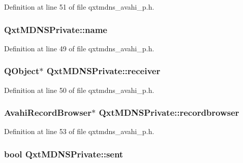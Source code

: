 Definition at line 51 of file qxtmdns\-\_\-avahi\-\_\-p.\-h.

\hypertarget{class_qxt_m_d_n_s_private_acf3fda20dc948af2f060c90a042dc545}{
\subsubsection[{name}]{ Qxt\-M\-D\-N\-S\-Private\-::name}}\label{class_qxt_m_d_n_s_private_acf3fda20dc948af2f060c90a042dc545}


Definition at line 49 of file qxtmdns\-\_\-avahi\-\_\-p.\-h.

\hypertarget{class_qxt_m_d_n_s_private_acfd639c9dc24a9f61a9ced21f723e5c9}{
\subsubsection[{receiver}]{\setlength{\rightskip}{0pt plus 5cm}Q\-Object$\ast$ Qxt\-M\-D\-N\-S\-Private\-::receiver}}\label{class_qxt_m_d_n_s_private_acfd639c9dc24a9f61a9ced21f723e5c9}


Definition at line 50 of file qxtmdns\-\_\-avahi\-\_\-p.\-h.

\hypertarget{class_qxt_m_d_n_s_private_a5614d288f518b9f735c2653b4d910f98}{
\subsubsection[{recordbrowser}]{\setlength{\rightskip}{0pt plus 5cm}Avahi\-Record\-Browser$\ast$ Qxt\-M\-D\-N\-S\-Private\-::recordbrowser}}\label{class_qxt_m_d_n_s_private_a5614d288f518b9f735c2653b4d910f98}


Definition at line 53 of file qxtmdns\-\_\-avahi\-\_\-p.\-h.

\hypertarget{class_qxt_m_d_n_s_private_aa1cffbdc147c9f9e15eb8b96b8845982}{
\subsubsection[{sent}]{\setlength{\rightskip}{0pt plus 5cm}bool Qxt\-M\-D\-N\-S\-Private\-::sent}}\label{class_qxt_m_d_n_s_private_aa1cffbdc147c9f9e15eb8b96b8845982}


